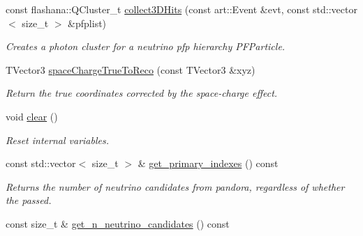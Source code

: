 \begin{DoxyCompactItemize}
const flashana\-::\-Q\-Cluster\-\_\-t \hyperlink{classlee_1_1ElectronEventSelectionAlg_a194dc0ef0d33314f77e45d134932ac3c}{collect3\-D\-Hits} (const art\-::\-Event \&evt, const std\-::vector$<$ size\-\_\-t $>$ \&pfplist)
\begin{DoxyCompactList}\small\item\em Creates a photon cluster for a neutrino pfp hierarchy P\-F\-Particle. \end{DoxyCompactList}\item 
T\-Vector3 \hyperlink{classlee_1_1ElectronEventSelectionAlg_a38772f4cd346a40fd3f30eba3bc505a9}{space\-Charge\-True\-To\-Reco} (const T\-Vector3 \&xyz)
\begin{DoxyCompactList}\small\item\em Return the true coordinates corrected by the space-\/charge effect. \end{DoxyCompactList}\item 
\hypertarget{classlee_1_1ElectronEventSelectionAlg_a9f320d7d843471c4f61409adf2c4d690}{void \hyperlink{classlee_1_1ElectronEventSelectionAlg_a9f320d7d843471c4f61409adf2c4d690}{clear} ()}\label{classlee_1_1ElectronEventSelectionAlg_a9f320d7d843471c4f61409adf2c4d690}

\begin{DoxyCompactList}\small\item\em Reset internal variables. \end{DoxyCompactList}\item 
const std\-::vector$<$ size\-\_\-t $>$ \& \hyperlink{classlee_1_1ElectronEventSelectionAlg_a317c107f710fc965cd7e062ac933d3df}{get\-\_\-primary\-\_\-indexes} () const 
\begin{DoxyCompactList}\small\item\em Returns the number of neutrino candidates from pandora, regardless of whether the passed. \end{DoxyCompactList}\item 
\hypertarget{classlee_1_1ElectronEventSelectionAlg_a6259851e755db48eb0dd831708212e27}{const size\-\_\-t \& \hyperlink{classlee_1_1ElectronEventSelectionAlg_a6259851e755db48eb0dd831708212e27}{get\-\_\-n\-\_\-neutrino\-\_\-candidates} () const }\label{classlee_1_1ElectronEventSelectionAlg_a6259851e755db48eb0dd831708212e27}


\end{DoxyCompactItemize}
